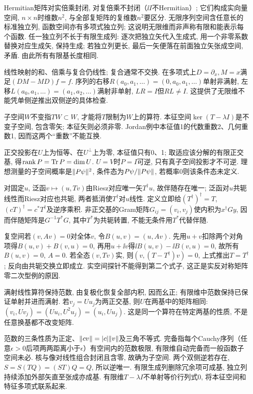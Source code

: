 Hermitian矩阵对实倍乘封闭, 对复倍乘不封闭（$\ii I$不Hermitian）; 它们构成实向量空间, $n\times n$时维数$n^2$, 与全部复矩阵的复维数$n^2$要区分. 无限序列空间含任意长的标准独立列, 函数空间亦有多项式独立列; 这说明无限维而非声称有限和能表示每个函数. 任一独立列不长于有限生成列: 逐次把独立矢代入生成式, 用一个非零系数替换对应生成矢, 保持生成; 若独立列更长, 最后一矢便落在前面独立矢张成空间, 矛盾. 由此所有有限基长度相同.

线性映射的和、倍乘与复合仍线性; 复合通常不交换. 在多项式上$D=\partial_x,M=x$满足$(DM-MD)f=f$. 序列的右移$R(a_0,a_1,\ldots)=(0,a_0,a_1,\ldots)$单射非满射, 左移$L(a_0,a_1,\ldots)=(a_1,a_2,\ldots)$满射非单射, $LR=I$但$RL\ne I$. 这提供了无限维不能凭单侧逆推出双侧逆的具体检查.

子空间$W$不变指$TW\subset W$, 才能将$T$限制为$W$上的算符. 本征空间$\ker(T-\lambda I)$是不变子空间, 包含零矢; 本征矢则必须非零. Jordan例中本征值1的代数重数2、几何重数1, 因而这两个“重数”不能互换.

正交投影在$U$上为恒等、在$U^\perp$上为零, 本征值只有0、1; 取适应该分解的有限正交基, 得$\operatorname{rank}P=\operatorname{Tr} P=\dim U$. $U=V$时$P=I$可逆, 只有真子空间投影才不可逆. 理想测量的子空间概率是$\lVert P\psi\rVert^2$, 条件态为$P\psi/\lVert P\psi\rVert$, 若概率0则该条件态未定义.

对固定$u$, 泛函$v\mapsto(u,Tv)$由Riesz对应唯一矢$T^\dagger u$, 故伴随存在唯一; 泛函对$u$共轭线性而Riesz对应也共轭, 两者抵消使$T^\dagger$对$u$线性. 定义立即给$(T^\dagger)^\dagger=T$, $(cT)^\dagger=c^*T^\dagger$及逆序乘积. 非正交基的Gram矩阵$G_{ij}=(v_i,v_j)$使内积为$x^\dagger Gy$, 因而伴随矩阵是$G^{-1}T^*G$, 其中$T^*$为共轭转置, 不能无条件用$T^*$代替伴随.

复空间若$(v,Av)=0$对全体$v$, 令$B(u,v)=(u,Av)$. 先用$u+v$扣除两个对角项得$B(u,v)+B(v,u)=0$, 再用$u+\ii v$得$\ii B(u,v)-\ii B(v,u)=0$, 故所有$B(u,v)=0$, $A=0$. 若全态$(v,Tv)$实, 则$(v,(T-T^\dagger)v)=0$, 上式推出$T=T^\dagger$; 反向由共轭交换立即成立. 实空间探针不能得到第二个式子, 这正是实反对称矩阵零二次型例的原因.

满射线性算符保持范数, 由复极化恢复全部内积, 因而幺正; 有限维中范数保持已保证单射并进而满射. 若$v_j=Uu_j$为两正交基, 则$U$在两基中的矩阵相同: $(v_i,Uv_j)=(Uu_i,U^2u_j)=(u_i,Uu_j)$. 这是同一个算符在特定两基的性质, 不是任意换基都不改变矩阵.


范数的三条性质为正定、$\lVert cv\rVert=|c|\lVert v\rVert$及三角不等式. 完备指每个Cauchy序列（任意$\epsilon>0$后项两两距离小于$\epsilon$）有空间内的范数极限, 有限维自动完备而一般函数子空间未必. 核与像对线性组合封闭且含零, 故确为子空间. 两个双侧逆若存在,$S=S(TQ)=(ST)Q=Q$, 所以逆唯一. 有限生成列删除冗余项可成基, 独立列持续添加外部矢直至张成亦成基. 有限维$T-\lambda I$不单射等价行列式0, 将本征空间和特征多项式联系起来.

